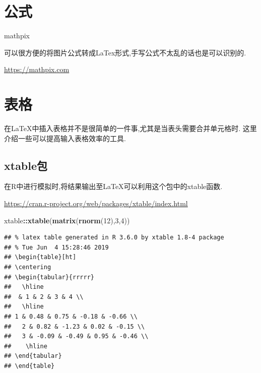\documentclass[]{ctexbook}
\newenvironment{Shaded}{\begin{snugshade}}{\end{snugshade}}
\newcommand{\DecValTok}[1]{\textcolor[rgb]{0.00,0.00,0.81}{#1}}
\newcommand{\KeywordTok}[1]{\textcolor[rgb]{0.13,0.29,0.53}{\textbf{#1}}}
\newcommand{\NormalTok}[1]{#1}
\newcommand{\OperatorTok}[1]{\textcolor[rgb]{0.81,0.36,0.00}{\textbf{#1}}}
\begin{document}
\hypertarget{section-22}{%
\section{公式}\label{section-22}}

mathpix

可以很方便的将图片公式转成LaTex形式,手写公式不太乱的话也是可以识别的.

\url{https://mathpix.com}

\hypertarget{section-23}{%
\section{表格}\label{section-23}}

在LaTeX中插入表格并不是很简单的一件事,尤其是当表头需要合并单元格时.
这里介绍一些可以提高输入表格效率的工具.

\hypertarget{xtable}{%
\subsection{xtable包}\label{xtable}}

在R中进行模拟时,将结果输出至LaTeX可以利用这个包中的xtable函数.

\url{https://cran.r-project.org/web/packages/xtable/index.html}

\begin{Shaded}
\begin{Highlighting}[]
\NormalTok{xtable}\OperatorTok{::}\KeywordTok{xtable}\NormalTok{(}\KeywordTok{matrix}\NormalTok{(}\KeywordTok{rnorm}\NormalTok{(}\DecValTok{12}\NormalTok{),}\DecValTok{3}\NormalTok{,}\DecValTok{4}\NormalTok{))}
\end{Highlighting}
\end{Shaded}

\begin{verbatim}
## % latex table generated in R 3.6.0 by xtable 1.8-4 package
## % Tue Jun  4 15:28:46 2019
## \begin{table}[ht]
## \centering
## \begin{tabular}{rrrrr}
##   \hline
##  & 1 & 2 & 3 & 4 \\ 
##   \hline
## 1 & 0.48 & 0.75 & -0.18 & -0.66 \\ 
##   2 & 0.82 & -1.23 & 0.02 & -0.15 \\ 
##   3 & -0.09 & -0.49 & 0.95 & -0.46 \\ 
##    \hline
## \end{tabular}
## \end{table}
\end{verbatim}
\end{document}
